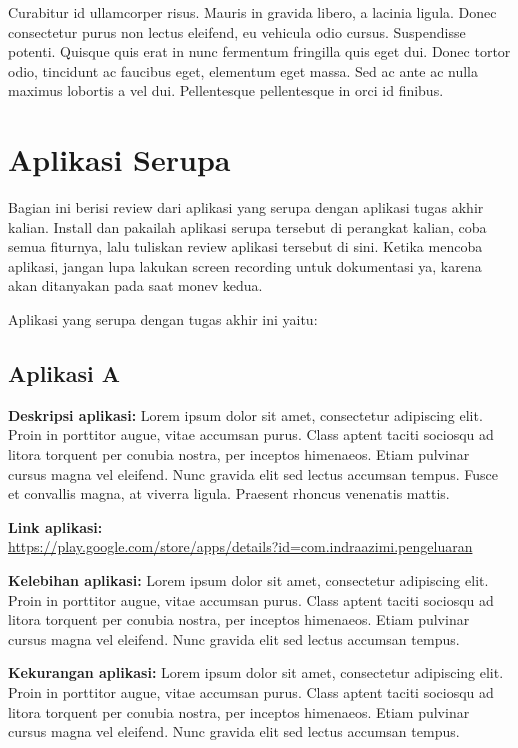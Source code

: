 \documentclass[a4paper,11pt,oneside]{report}
\begin{document}
Curabitur id ullamcorper risus. Mauris in gravida libero, a lacinia ligula.
Donec consectetur purus non lectus eleifend, eu vehicula odio cursus.
Suspendisse potenti. Quisque quis erat in nunc fermentum fringilla quis eget
dui. Donec tortor odio, tincidunt ac faucibus eget, elementum eget massa. Sed ac
ante ac nulla maximus lobortis a vel dui. Pellentesque pellentesque in orci id
finibus.

\section{Aplikasi Serupa}
Bagian ini berisi review dari aplikasi yang serupa dengan aplikasi tugas akhir
kalian. Install dan pakailah aplikasi serupa tersebut di perangkat kalian, coba
semua fiturnya, lalu tuliskan review aplikasi tersebut di sini. Ketika mencoba
aplikasi, jangan lupa lakukan screen recording untuk dokumentasi ya, karena akan
ditanyakan pada saat monev kedua.

Aplikasi yang serupa dengan tugas akhir ini yaitu:

\subsection{Aplikasi A}
\textbf{Deskripsi aplikasi:} Lorem ipsum dolor sit amet, consectetur adipiscing
elit. Proin in porttitor augue, vitae accumsan purus. Class aptent taciti
sociosqu ad litora torquent per conubia nostra, per inceptos himenaeos. Etiam
pulvinar cursus magna vel eleifend. Nunc gravida elit sed lectus accumsan tempus.
Fusce et convallis magna, at viverra ligula. Praesent rhoncus venenatis mattis.

\textbf{Link aplikasi:}\\
\url{https://play.google.com/store/apps/details?id=com.indraazimi.pengeluaran}

\textbf{Kelebihan aplikasi:} Lorem ipsum dolor sit amet, consectetur adipiscing
elit. Proin in porttitor augue, vitae accumsan purus. Class aptent taciti
sociosqu ad litora torquent per conubia nostra, per inceptos himenaeos. Etiam
pulvinar cursus magna vel eleifend. Nunc gravida elit sed lectus accumsan tempus.

\textbf{Kekurangan aplikasi:} Lorem ipsum dolor sit amet, consectetur adipiscing
elit. Proin in porttitor augue, vitae accumsan purus. Class aptent taciti
sociosqu ad litora torquent per conubia nostra, per inceptos himenaeos. Etiam
pulvinar cursus magna vel eleifend. Nunc gravida elit sed lectus accumsan tempus.
\end{document}
